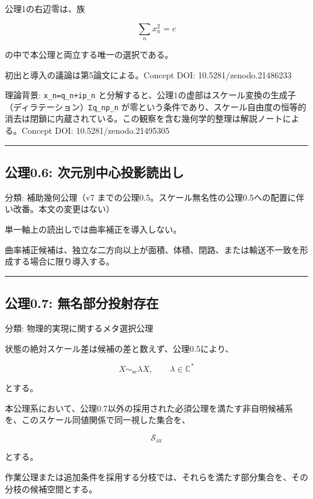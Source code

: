 \documentclass[
  a4paper,
]{ltjsarticle}
\begin{document}
公理1の右辺零は、族

\[
\sum_n x_n^2=c
\]

の中で本公理と両立する唯一の選択である。

初出と導入の議論は第5論文による。Concept DOI: 10.5281/zenodo.21486233

理論背景: \texttt{x\_n=q\_n+ip\_n}
と分解すると、公理1の虚部はスケール変換の生成子（ディラテーション）\texttt{Σq\_np\_n}
が零という条件であり、スケール自由度の恒等的消去は閉鎖に内蔵されている。この観察を含む幾何学的整理は解説ノートによる。Concept
DOI: 10.5281/zenodo.21495305

\begin{center}\rule{0.5\linewidth}{0.5pt}\end{center}

\subsection{公理0.6:
次元別中心投影読出し}\label{ux516cux74060.6-ux6b21ux5143ux5225ux4e2dux5fc3ux6295ux5f71ux8aadux51faux3057}

分類: 補助幾何公理（v7
までの公理0.5。スケール無名性の公理0.5への配置に伴い改番。本文の変更はない）

単一軸上の読出しでは曲率補正を導入しない。

曲率補正候補は、独立な二方向以上が面積、体積、閉路、または輸送不一致を形成する場合に限り導入する。

\begin{center}\rule{0.5\linewidth}{0.5pt}\end{center}

\subsection{公理0.7:
無名部分投射存在}\label{ux516cux74060.7-ux7121ux540dux90e8ux5206ux6295ux5c04ux5b58ux5728}

分類: 物理的実現に関するメタ選択公理

状態の絶対スケール差は候補の差と数えず、公理0.5により、

\[
X\sim_{\mathrm{sc}}\lambda X,
\qquad
\lambda\in\mathbb C^\ast
\]

とする。

本公理系において、公理0.7以外の採用された必須公理を満たす非自明候補系を、このスケール同値関係で同一視した集合を、

\[
\mathscr S_{\mathrm{ax}}
\]

とする。

作業公理または追加条件を採用する分枝では、それらを満たす部分集合を、その分枝の候補空間とする。
\end{document}
